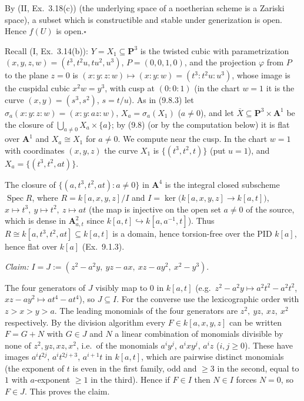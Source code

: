 \documentclass[11pt]{article}
\begin{document}
By (II, Ex.~3.18(c)) (the underlying space of a noetherian scheme is a Zariski space), a subset which is constructible and stable under generization is open. Hence $f(U)$ is open.\hfill$\square$

\pf
Recall (I, Ex.~3.14(b)): $Y=X_1\subseteq\mathbf P^3$ is the twisted cubic with parametrization $(x,y,z,w)=(t^3,t^2u,tu^2,u^3)$, $P=(0,0,1,0)$, and the projection $\varphi$ from $P$ to the plane $z=0$ is $(x:y:z:w)\mapsto(x:y:w)=(t^3:t^2u:u^3)$, whose image is the cuspidal cubic $x^2w=y^3$, with cusp at $(0:0:1)$ (in the chart $w=1$ it is the curve $(x,y)=(s^3,s^2)$, $s=t/u$). As in (9.8.3) let $\sigma_a(x:y:z:w)=(x:y:az:w)$, $X_a=\sigma_a(X_1)$ ($a\ne0$), and let $\overline X\subseteq\mathbf P^3\times\mathbf A^1$ be the closure of $\bigcup_{a\ne0}X_a\times\{a\}$; by (9.8) (or by the computation below) it is flat over $\mathbf A^1$ and $X_a\cong X_1$ for $a\ne0$. We compute near the cusp. In the chart $w=1$ with coordinates $(x,y,z)$ the curve $X_1$ is $\{(t^3,t^2,t)\}$ (put $u=1$), and $X_a=\{(t^3,t^2,at)\}$.

The closure of $\{(a,t^3,t^2,at):a\ne0\}$ in $\mathbf A^4$ is the integral closed subscheme $\operatorname{Spec}R$, where $R=k[a,x,y,z]/I$ and $I=\ker\bigl(k[a,x,y,z]\to k[a,t]\bigr)$, $x\mapsto t^3,\ y\mapsto t^2,\ z\mapsto at$ (the map is injective on the open set $a\ne0$ of the source, which is dense in $\mathbf A^2_{a,t}$ since $k[a,t]\hookrightarrow k[a,a^{-1},t]$). Thus $R\cong k[a,t^3,t^2,at]\subseteq k[a,t]$ is a domain, hence torsion-free over the PID $k[a]$, hence flat over $k[a]$ (Ex.~9.1.3).

\emph{Claim:} $I=J:=(z^2-a^2y,\ yz-ax,\ xz-ay^2,\ x^2-y^3)$.

The four generators of $J$ visibly map to $0$ in $k[a,t]$ (e.g.\ $z^2-a^2y\mapsto a^2t^2-a^2t^2$, $xz-ay^2\mapsto at^4-at^4$), so $J\subseteq I$. For the converse use the lexicographic order with $z>x>y>a$. The leading monomials of the four generators are $z^2,\ yz,\ xz,\ x^2$ respectively. By the division algorithm every $F\in k[a,x,y,z]$ can be written $F=G+N$ with $G\in J$ and $N$ a linear combination of monomials divisible by none of $z^2,yz,xz,x^2$, i.e.\ of the monomials $a^iy^j$, $a^ixy^j$, $a^iz$ ($i,j\ge0$). These have images $a^it^{2j}$, $a^it^{2j+3}$, $a^{i+1}t$ in $k[a,t]$, which are pairwise distinct monomials (the exponent of $t$ is even in the first family, odd and $\ge3$ in the second, equal to $1$ with $a$-exponent $\ge1$ in the third). Hence if $F\in I$ then $N\in I$ forces $N=0$, so $F\in J$. This proves the claim.
\end{document}
